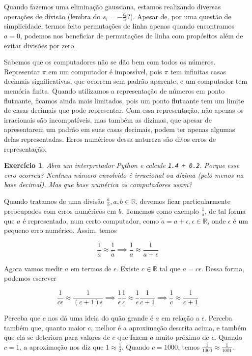 \documentclass[]{article}
\newtheorem{exercicio}{Exercício}
\numberwithin{equation}{section}
\begin{document}
Quando fazemos uma eliminação gaussiana, estamos realizando diversas operações de divisão (lembra do $s_i = -\frac{c_i}{a}$?). Apesar de, por uma questão de simplicidade, termos feito permutações de linha apenas quando encontramos $a = 0$, podemos nos beneficiar de permutações de linha com propósitos além de evitar divisões por zero.

Sabemos que os computadores não se dão bem com todos os números. Representar $\pi$ em um computador é impossível, pois $\pi$ tem infinitas casas decimais significativas, que ocorrem sem padrão aparente, e um computador tem memória finita. Quando utilizamos a representação de números em ponto flutuante, ficamos ainda mais limitados, pois um ponto flutuante tem um limite de casas decimais que pode representar. Com essa representação, não apenas os irracionais são incompatíveis, mas também as dízimas, que apesar de apresentarem um padrão em suas casas decimais, podem ter apenas algumas delas representadas. Erros numéricos dessa natureza são ditos erros de representação.

\begin{exercicio}
	Abra um interpretador Python e calcule \texttt{1.4 + 0.2}. Porque esse erro ocorreu? Nenhum número envolvido é irracional ou dízima (pelo menos na base decimal). Mas que base numérica os computadores usam?
\end{exercicio}

Quando tratamos de uma divisão $\frac{a}{b}, a, b \in \mathbb{R}$, devemos ficar particularmente preocupados com erros numéricos em $b$. Tomemos como exemplo $\frac{1}{a}$, de tal forma que $a$ é representado, num certo computador, como $\tilde{a} = a + \epsilon, \epsilon \in \mathbb{R}$, onde $\epsilon$ é um pequeno erro numérico. Assim, temos

$$
\frac{1}{a} \approx \frac{1}{\tilde{a}} \implies \frac{1}{a} \approx \frac{1}{a + \epsilon}
$$

Agora vamos medir $a$ em termos de $\epsilon$. Existe $c \in \mathbb{R}$ tal que $a = c \epsilon$. Dessa forma, podemos escrever

$$
\frac{1}{c \epsilon} \approx \frac{1}{(c + 1) \epsilon} \implies \frac{1}{\epsilon} \frac{1}{c} \approx \frac{1}{\epsilon} \frac{1}{c + 1} \implies \frac{1}{c} \approx \frac{1}{c + 1}
$$

Perceba que $c$ nos dá uma ideia do quão grande é $a$ em relação a $\epsilon$. Perceba também que, quanto maior $c$, melhor é a aproximação descrita acima, e também que ela se deteriora para valores de $c$ que fazem $a$ muito próximo de $\epsilon$. Quando $c = 1$, a aproximação nos diz que $1 \approx \frac{1}{2}$. Quando $c = 1000$, temos $\frac{1}{1000} \approx \frac{1}{1001}$.
\end{document}
